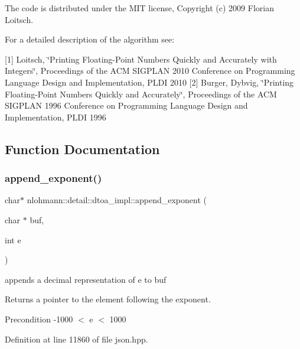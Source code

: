 The code is distributed under the M\+IT license, Copyright (c) 2009 Florian Loitsch.

For a detailed description of the algorithm see\+:

\mbox{[}1\mbox{]} Loitsch, \char`\"{}\+Printing Floating-\/\+Point Numbers Quickly and Accurately with
    Integers\char`\"{}, Proceedings of the A\+CM S\+I\+G\+P\+L\+AN 2010 Conference on Programming Language Design and Implementation, P\+L\+DI 2010 \mbox{[}2\mbox{]} Burger, Dybvig, \char`\"{}\+Printing Floating-\/\+Point Numbers Quickly and Accurately\char`\"{}, Proceedings of the A\+CM S\+I\+G\+P\+L\+AN 1996 Conference on Programming Language Design and Implementation, P\+L\+DI 1996 

\subsection{Function Documentation}
\mbox{\label{namespacenlohmann_1_1detail_1_1dtoa__impl_a84733638b826eda624488f5fa4521e0b}} 
\subsubsection{\texorpdfstring{append\_exponent()}{append\_exponent()}}
{\footnotesize\ttfamily char$\ast$ nlohmann\+::detail\+::dtoa\+\_\+impl\+::append\+\_\+exponent (\begin{DoxyParamCaption}\item[{char $\ast$}]{buf,  }\item[{int}]{e }\end{DoxyParamCaption})\hspace{0.3cm}{\ttfamily [inline]}}



appends a decimal representation of e to buf 

\begin{DoxyReturn}{Returns}
a pointer to the element following the exponent. 
\end{DoxyReturn}
\begin{DoxyPrecond}{Precondition}
-\/1000 $<$ e $<$ 1000 
\end{DoxyPrecond}


Definition at line 11860 of file json.\+hpp.

